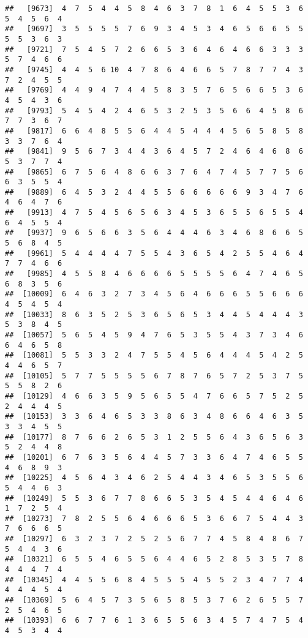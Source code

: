 \documentclass[
]{book}
\begin{document}
\begin{verbatim}
##   [9673]  4  7  5  4  4  5  8  4  6  3  7  8  1  6  4  5  5  3  6  5  4  5  6  4
##   [9697]  3  5  5  5  5  7  6  9  3  4  5  3  4  6  5  6  6  5  5  5  5  3  6  3
##   [9721]  7  5  4  5  7  2  6  6  5  3  6  4  6  4  6  6  3  3  3  5  7  4  6  6
##   [9745]  4  4  5  6 10  4  7  8  6  4  6  6  5  7  8  7  7  4  3  7  2  4  5  5
##   [9769]  4  4  9  4  7  4  4  5  8  3  5  7  6  5  6  6  5  3  6  4  5  4  3  6
##   [9793]  5  4  5  4  2  4  6  5  3  2  5  3  5  6  6  4  5  8  6  7  7  3  6  7
##   [9817]  6  6  4  8  5  5  6  4  4  5  4  4  4  5  6  5  8  5  8  3  3  7  6  4
##   [9841]  9  5  6  7  3  4  4  3  6  4  5  7  2  4  6  4  6  8  6  5  3  7  7  4
##   [9865]  6  7  5  6  4  8  6  6  3  7  6  4  7  4  5  7  7  5  6  6  3  5  5  4
##   [9889]  6  4  5  3  2  4  4  5  5  6  6  6  6  6  9  3  4  7  6  4  6  4  7  6
##   [9913]  4  7  5  4  5  6  5  6  3  4  5  3  6  5  5  6  5  5  4  6  4  5  5  4
##   [9937]  9  6  5  6  6  3  5  6  4  4  4  6  3  4  6  8  6  6  5  5  6  8  4  5
##   [9961]  5  4  4  4  4  7  5  5  4  3  6  5  4  2  5  5  4  6  4  7  7  4  6  6
##   [9985]  4  5  5  8  4  6  6  6  6  5  5  5  5  6  4  7  4  6  5  6  8  3  5  6
##  [10009]  6  4  6  3  2  7  3  4  5  6  4  6  6  6  5  5  6  6  6  4  5  4  5  4
##  [10033]  8  6  3  5  2  5  3  6  5  6  5  3  4  4  5  4  4  4  3  5  3  8  4  5
##  [10057]  5  6  5  4  5  9  4  7  6  5  3  5  5  4  3  7  3  4  6  6  4  6  5  8
##  [10081]  5  5  3  3  2  4  7  5  5  4  5  6  4  4  4  5  4  2  5  4  4  6  5  7
##  [10105]  5  7  7  5  5  5  5  6  7  8  7  6  5  7  2  5  3  7  5  5  5  8  2  6
##  [10129]  4  6  6  3  5  9  5  6  5  5  4  7  6  6  5  7  5  2  5  2  4  4  4  5
##  [10153]  3  3  6  4  6  5  3  3  8  6  3  4  8  6  6  4  6  3  5  3  3  4  5  5
##  [10177]  8  7  6  6  2  6  5  3  1  2  5  5  6  4  3  6  5  6  3  5  2  4  4  8
##  [10201]  6  7  6  3  5  6  4  4  5  7  3  3  6  4  7  4  6  5  5  4  6  8  9  3
##  [10225]  4  5  6  4  3  4  6  2  5  4  4  3  4  6  5  3  5  5  6  5  4  4  6  3
##  [10249]  5  5  3  6  7  7  8  6  6  5  3  5  4  5  4  4  6  4  6  1  7  2  5  4
##  [10273]  7  8  2  5  5  6  4  6  6  6  5  3  6  6  7  5  4  4  3  7  6  6  6  5
##  [10297]  6  3  2  3  7  2  5  2  5  6  7  7  4  5  8  4  8  6  7  5  4  4  3  6
##  [10321]  6  5  5  4  6  5  5  6  4  4  6  5  2  8  5  3  5  7  8  4  4  4  7  4
##  [10345]  4  4  5  5  6  8  4  5  5  5  4  5  5  2  3  4  7  7  4  4  4  4  5  4
##  [10369]  5  6  4  5  7  3  5  6  5  8  5  3  7  6  2  6  5  5  7  2  5  4  6  5
##  [10393]  6  6  7  7  6  1  3  6  5  5  6  3  4  5  7  4  7  5  4  4  5  3  4  4

\end{verbatim}
\end{document}
